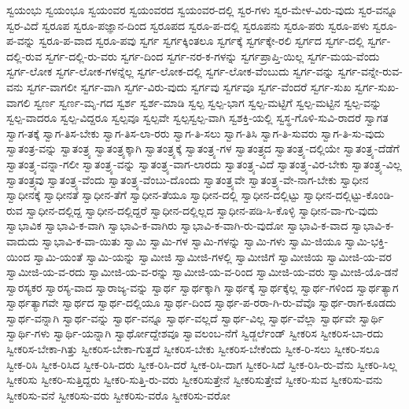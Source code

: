 {ಸ್ವಯಂಭು
ಸ್ವಯಂಭೂ
ಸ್ವಯಂವರ
ಸ್ವಯಂವರದ
ಸ್ವಯಂವರ-ದಲ್ಲಿ
ಸ್ವರ-ಗಳು
ಸ್ವರ-ಮೇಳ-ವಿರು-ವುದು
ಸ್ವರ-ವನ್ನೂ
ಸ್ವರ-ವಿದೆ
ಸ್ವರೂಪ
ಸ್ವರೂ-ಪಜ್ಞಾನ-ದಿಂದ
ಸ್ವರೂಪದ
ಸ್ವರೂ-ಪ-ದಲ್ಲಿ
ಸ್ವರೂಪನು
ಸ್ವರೂ-ಪರು
ಸ್ವರೂ-ಪಳು
ಸ್ವರೂ-ಪ-ವನ್ನು
ಸ್ವರೂ-ಪ-ವಾದ
ಸ್ವರೂ-ಪವು
ಸ್ವರ್ಗ
ಸ್ವರ್ಗಕ್ಕಿಂತಲೂ
ಸ್ವರ್ಗಕ್ಕೆ
ಸ್ವರ್ಗಕ್ಕೇ-ರಲಿ
ಸ್ವರ್ಗದ
ಸ್ವರ್ಗ-ದಲ್ಲಿ
ಸ್ವರ್ಗ-ದಲ್ಲಿ-ರುವ
ಸ್ವರ್ಗ-ದಲ್ಲಿ-ರು-ವರು
ಸ್ವರ್ಗ-ದಿಂದ
ಸ್ವರ್ಗ-ನರ-ಕ-ಗಳನ್ನು
ಸ್ವರ್ಗಪ್ರಾಪ್ತಿ-ಯಿಲ್ಲ
ಸ್ವರ್ಗ-ಮಯ-ವೆಂದು
ಸ್ವರ್ಗ-ಲೋಕ
ಸ್ವರ್ಗ-ಲೋಕ-ಗಳನ್ನೆಲ್ಲ
ಸ್ವರ್ಗ-ಲೋಕ-ದಲ್ಲಿ
ಸ್ವರ್ಗ-ಲೋಕ-ವೆಂಬುದು
ಸ್ವರ್ಗ-ವನ್ನು
ಸ್ವರ್ಗ-ವನ್ನೇ-ರುವ-ವನು
ಸ್ವರ್ಗ-ವಾಗಲೀ
ಸ್ವರ್ಗ-ವಾಗಿ
ಸ್ವರ್ಗ-ವಿರು-ವುದು
ಸ್ವರ್ಗವು
ಸ್ವರ್ಗವೂ
ಸ್ವರ್ಗ-ವೆಂದರೆ
ಸ್ವರ್ಗ-ಸುಖ
ಸ್ವರ್ಗ-ಸುಖ-ವಾಗಲಿ
ಸ್ವರ್ಣ
ಸ್ವರ್ಣ-ಮೃ-ಗದ
ಸ್ವರ್ಶ
ಸ್ವರ್ಶ-ಮಾಡಿ
ಸ್ವಲ್ಪ
ಸ್ವಲ್ಪ-ಭಾಗ
ಸ್ವಲ್ಪ-ಮಟ್ಟಿಗೆ
ಸ್ವಲ್ಪ-ಮಟ್ಟಿನ
ಸ್ವಲ್ಪ-ವನ್ನು
ಸ್ವಲ್ಪ-ವಾದರೂ
ಸ್ವಲ್ಪ-ವಿದ್ದರೂ
ಸ್ವಲ್ಪವೂ
ಸ್ವಲ್ಪವೇ
ಸ್ವಲ್ಪಸ್ವಲ್ಪ-ವಾಗಿ
ಸ್ವಶಕ್ತಿ-ಯಲ್ಲಿ
ಸ್ವಸ್ಥ-ಗೊಳಿ-ಸುವಿ-ರಾದರೆ
ಸ್ವಾಗತ
ಸ್ವಾಗ-ತಕ್ಕೆ
ಸ್ವಾಗ-ತಿಸ-ಬೇಕು
ಸ್ವಾಗ-ತಿಸ-ಲಾ-ರರು
ಸ್ವಾಗ-ತಿ-ಸಲು
ಸ್ವಾಗ-ತಿಸಿ
ಸ್ವಾಗ-ತಿ-ಸುವರು
ಸ್ವಾಗ-ತಿ-ಸು-ವುದು
ಸ್ವಾತಂತ್ರ-ವನ್ನು
ಸ್ವಾತಂತ್ರ್ಯ
ಸ್ವಾತಂತ್ರ್ಯಕ್ಕಾಗಿ
ಸ್ವಾತಂತ್ರ್ಯಕ್ಕೆ
ಸ್ವಾತಂತ್ರ್ಯ-ಗಳ
ಸ್ವಾತಂತ್ರ್ಯದ
ಸ್ವಾತಂತ್ರ್ಯ-ದಲ್ಲಿಯೇ
ಸ್ವಾತಂತ್ರ್ಯ-ದೆಡೆಗೆ
ಸ್ವಾತಂತ್ರ್ಯ-ವನ್ನಾ-ಗಲೀ
ಸ್ವಾತಂತ್ರ್ಯ-ವನ್ನು
ಸ್ವಾತಂತ್ರ್ಯ-ವಾಗ-ಲಾರದು
ಸ್ವಾತಂತ್ರ್ಯ-ವಿದೆ
ಸ್ವಾತಂತ್ರ್ಯ-ವಿರ-ಬೇಕು
ಸ್ವಾತಂತ್ರ್ಯ-ವಿಲ್ಲ
ಸ್ವಾತಂತ್ರ್ಯವು
ಸ್ವಾತಂತ್ರ್ಯ-ವೆಂದು
ಸ್ವಾತಂತ್ರ್ಯ-ವೆಂಬು-ದೊಂದು
ಸ್ವಾತಂತ್ರ್ಯವೇ
ಸ್ವಾತಂತ್ರ್ಯ-ವೇ-ನಾಗ-ಬೇಕು
ಸ್ವಾಧೀನ
ಸ್ವಾಧೀನಕ್ಕೆ
ಸ್ವಾಧೀನತೆ
ಸ್ವಾಧೀನ-ತೆಗೆ
ಸ್ವಾಧೀನ-ತೆಯೂ
ಸ್ವಾಧೀನ-ದಲ್ಲಿ
ಸ್ವಾಧೀನ-ದಲ್ಲಿಟ್ಟು
ಸ್ವಾಧೀನ-ದಲ್ಲಿಟ್ಟು-ಕೊಂಡಿ-ರುವ
ಸ್ವಾಧೀನ-ದಲ್ಲಿದ್ದ
ಸ್ವಾಧೀನ-ದಲ್ಲಿದ್ದರೆ
ಸ್ವಾಧೀನ-ದಲ್ಲಿಲ್ಲದ
ಸ್ವಾಧೀನ-ಪಡಿ-ಸಿ-ಕೊಳ್ಳಿ
ಸ್ವಾಧೀನ-ವಾ-ಗು-ವುದು
ಸ್ವಾಭಾವಿಕ
ಸ್ವಾಭಾವಿ-ಕ-ವಾಗಿ
ಸ್ವಾಭಾವಿ-ಕ-ವಾಗಿರು
ಸ್ವಾಭಾವಿ-ಕ-ವಾಗಿ-ರು-ವುದೋ
ಸ್ವಾಭಾವಿ-ಕ-ವಾದ
ಸ್ವಾಭಾವಿ-ಕ-ವಾದುದು
ಸ್ವಾಭಾವಿ-ಕ-ವಾ-ಯಿತು
ಸ್ವಾಮಿ
ಸ್ವಾಮಿ-ಗಳ
ಸ್ವಾಮಿ-ಗಳನ್ನು
ಸ್ವಾಮಿ-ಗಳು
ಸ್ವಾಮಿ-ಜಿಯೂ
ಸ್ವಾಮಿ-ಭಕ್ತಿ-ಯಿಂದ
ಸ್ವಾಮಿ-ಯಂತೆ
ಸ್ವಾಮಿ-ಯನ್ನು
ಸ್ವಾಮೀಜಿ
ಸ್ವಾಮೀಜಿ-ಗಳಲ್ಲಿ
ಸ್ವಾಮೀಜಿಗೆ
ಸ್ವಾಮೀಜಿಯ
ಸ್ವಾಮೀಜಿ-ಯ-ವರ
ಸ್ವಾಮೀಜಿ-ಯ-ವ-ರದು
ಸ್ವಾಮೀಜಿ-ಯ-ವ-ರನ್ನು
ಸ್ವಾಮೀಜಿ-ಯ-ವ-ರಿಂದ
ಸ್ವಾಮೀಜಿ-ಯ-ವರು
ಸ್ವಾಮೀಜಿ-ಯೊ-ಡನೆ
ಸ್ವಾರಸ್ಯಕರ
ಸ್ವಾರಸ್ಯ-ವಾದ
ಸ್ವಾರಾಜ್ಯ-ವನ್ನು
ಸ್ವಾರ್ಥ
ಸ್ವಾರ್ಥಕ್ಕಾಗಿ
ಸ್ವಾರ್ಥಕ್ಕೆ
ಸ್ವಾರ್ಥಕ್ಕೆಲ್ಲ
ಸ್ವಾರ್ಥ-ಗಳಿಂದ
ಸ್ವಾರ್ಥತ್ಯಾಗ
ಸ್ವಾರ್ಥತ್ಯಾಗವೇ
ಸ್ವಾರ್ಥದ
ಸ್ವಾರ್ಥ-ದಲ್ಲಿಯೂ
ಸ್ವಾರ್ಥ-ದಿಂದ
ಸ್ವಾರ್ಥ-ಪ-ರರಾ-ಗಿ-ರು-ವೆವೊ
ಸ್ವಾರ್ಥ-ರಾಗ-ಕೂಡದು
ಸ್ವಾರ್ಥ-ವನ್ನಾಗಿ
ಸ್ವಾರ್ಥ-ವನ್ನು
ಸ್ವಾರ್ಥ-ವನ್ನೂ
ಸ್ವಾರ್ಥ-ವಲ್ಲದೆ
ಸ್ವಾರ್ಥ-ವಿಲ್ಲ
ಸ್ವಾರ್ಥ-ವೆಲ್ಲಾ
ಸ್ವಾರ್ಥವೇ
ಸ್ವಾರ್ಥಿ
ಸ್ವಾರ್ಥಿ-ಗಳು
ಸ್ವಾರ್ಥಿ-ಯನ್ನಾಗಿ
ಸ್ವಾರ್ಥೋದ್ದೇಶವೂ
ಸ್ವಾವಲಂಬ-ನೆಗೆ
ಸ್ವಿಡ್ಜರ್ಲೆಂಡ್
ಸ್ವೀಕರಿಸ
ಸ್ವೀಕರಿಸ-ಬಾ-ರದು
ಸ್ವೀಕರಿಸ-ಬೇಕಾ-ಗಿತ್ತು
ಸ್ವೀಕರಿಸ-ಬೇಕಾ-ಗುತ್ತದೆ
ಸ್ವೀಕರಿಸ-ಬೇಕು
ಸ್ವೀಕರಿಸ-ಬೇಕೆಂದು
ಸ್ವೀಕ-ರಿ-ಸಲು
ಸ್ವೀಕರಿ-ಸಲೂ
ಸ್ವೀಕ-ರಿಸಿ
ಸ್ವೀಕ-ರಿಸಿದ
ಸ್ವೀಕ-ರಿಸಿ-ದರು
ಸ್ವೀಕ-ರಿಸಿ-ದರೆ
ಸ್ವೀಕ-ರಿಸಿ-ದಾಗ
ಸ್ವೀಕರಿ-ಸಿದೆ
ಸ್ವೀಕ-ರಿಸಿ-ರು-ವೆನು
ಸ್ವೀಕರಿ-ಸಿಲ್ಲ
ಸ್ವೀಕರಿಸು
ಸ್ವೀಕರಿ-ಸುತ್ತಿದ್ದರು
ಸ್ವೀಕರಿ-ಸುತ್ತಿ-ರು-ವರು
ಸ್ವೀಕರಿಸುತ್ತೇನೆ
ಸ್ವೀಕರಿಸುತ್ತೇವೆ
ಸ್ವೀಕರಿ-ಸುವ
ಸ್ವೀಕರಿಸು-ವನು
ಸ್ವೀಕರಿಸು-ವನೆ
ಸ್ವೀಕರಿಸು-ವರು
ಸ್ವೀಕರಿಸು-ವರೊ
ಸ್ವೀಕರಿಸು-ವರೋ
}
